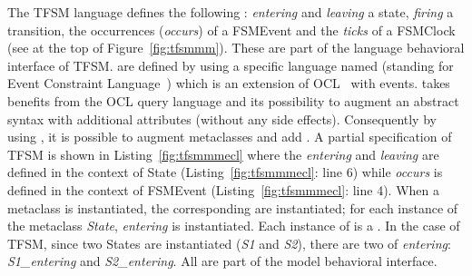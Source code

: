 The TFSM language defines the following \dse: \emph{entering} and \emph{leaving} a state, \emph{firing} a transition, the occurrences (\emph{occurs}) of a FSMEvent and the \emph{ticks} of a FSMClock (see at the top of Figure~\ref{fig:tfsmmm}). These \dse are part of the language behavioral interface of TFSM. \dse are defined by using a specific language named \ecl (standing for Event Constraint Language~\cite{ECL}) which is an extension of OCL~\cite{omgocl2} with events. \ecl takes benefits from the OCL query language and its possibility to augment an abstract syntax with additional attributes (without any side effects). Consequently by using \ecl, it is possible to augment \as metaclasses and add \dse. A partial \ecl specification of TFSM is shown in Listing~\ref{fig:tfsmmmecl} where the \dse \textit{entering} and \textit{leaving} are defined in the context of State (Listing~\ref{fig:tfsmmmecl}: line 6) while \textit{occurs} is defined in the context of FSMEvent (Listing~\ref{fig:tfsmmmecl}: line 4). When a metaclass is instantiated, the corresponding \dse are instantiated; \eg for each instance of the metaclass \emph{State}, \dse \textit{entering} is instantiated. Each instance of \dse is a \mse. In the case of TFSM, since two States are instantiated (\emph{S1} and \emph{S2}), there are two \mse of \textit{entering}: \textit{S1\_entering} and \textit{S2\_entering}. All \mse are part of the model behavioral interface. 

